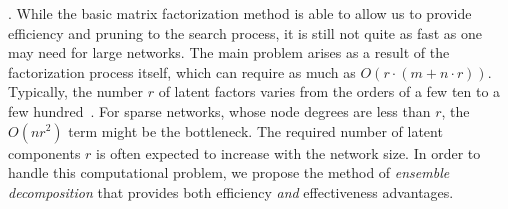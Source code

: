 . While the basic matrix factorization method is able to allow us to provide
efficiency and pruning to the search process, it is still not quite
as fast as one may need for large networks. The main problem
arises as a result of the factorization process itself, which can
require as much as $O(r \cdot (m + n\cdot r))$.  Typically, the
number $r$ of latent factors varies from the orders of a few ten to a few hundred~\cite{NMF-nature99, NMF-www2010}. For
sparse networks, whose node degrees are less than $r$, the $O(n
r^2)$ term might be the bottleneck.  The required  number of latent
components $r$ is often expected to increase with the network size. In
order to handle this computational problem, we propose the method of
{\em ensemble decomposition} that provides both efficiency {\em
and} effectiveness advantages.
